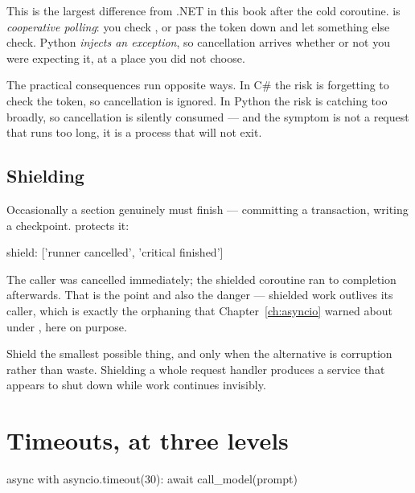 \begin{dotnetbox}
This is the largest difference from .NET in this book after the cold coroutine.
 is \emph{cooperative polling}: you check
, or pass the token down and let something else
check. Python \emph{injects an exception}, so cancellation arrives whether or not
you were expecting it, at a place you did not choose.

The practical consequences run opposite ways. In C\# the risk is forgetting to
check the token, so cancellation is ignored. In Python the risk is catching too
broadly, so cancellation is silently consumed --- and the symptom is not a
request that runs too long, it is a process that will not exit.
\end{dotnetbox}

\subsection{Shielding}
\label{sec:shield}

Occasionally a section genuinely must finish --- committing a transaction,
writing a checkpoint.  protects it:

\begin{console}
shield: ['runner cancelled', 'critical finished']
\end{console}

The caller was cancelled immediately; the shielded coroutine ran to completion
afterwards. That is the point and also the danger --- shielded work outlives its
caller, which is exactly the orphaning that Chapter~\ref{ch:asyncio} warned about
under , here on purpose.

\begin{warning}
Shield the smallest possible thing, and only when the alternative is corruption
rather than waste. Shielding a whole request handler produces a service that
appears to shut down while work continues invisibly.
\end{warning}

\section{Timeouts, at three levels}
\label{sec:timeouts}

\begin{python}[caption={The modern form}, label={lst:timeout}]
async with asyncio.timeout(30):
    await call_model(prompt)
\end{python}

